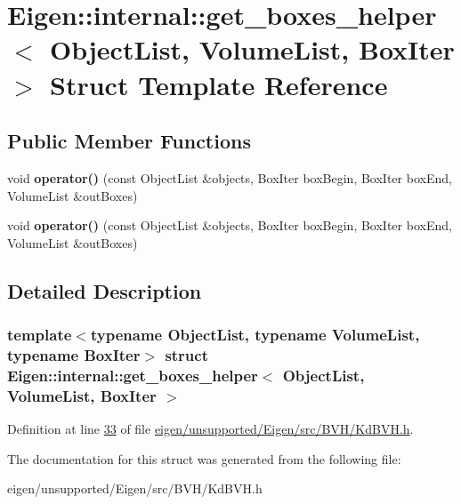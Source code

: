 \hypertarget{struct_eigen_1_1internal_1_1get__boxes__helper}{}\section{Eigen\+:\+:internal\+:\+:get\+\_\+boxes\+\_\+helper$<$ Object\+List, Volume\+List, Box\+Iter $>$ Struct Template Reference}
\label{struct_eigen_1_1internal_1_1get__boxes__helper}
\subsection*{Public Member Functions}
\begin{DoxyCompactItemize}
\item 
\mbox{\label{struct_eigen_1_1internal_1_1get__boxes__helper_ad3fcf7c11c88383d84b5db126bd310e4}} 
void {\bfseries operator()} (const Object\+List \&objects, Box\+Iter box\+Begin, Box\+Iter box\+End, Volume\+List \&out\+Boxes)
\item 
\mbox{\label{struct_eigen_1_1internal_1_1get__boxes__helper_ad3fcf7c11c88383d84b5db126bd310e4}} 
void {\bfseries operator()} (const Object\+List \&objects, Box\+Iter box\+Begin, Box\+Iter box\+End, Volume\+List \&out\+Boxes)
\end{DoxyCompactItemize}


\subsection{Detailed Description}
\subsubsection*{template$<$typename Object\+List, typename Volume\+List, typename Box\+Iter$>$\newline
struct Eigen\+::internal\+::get\+\_\+boxes\+\_\+helper$<$ Object\+List, Volume\+List, Box\+Iter $>$}



Definition at line \hyperlink{eigen_2unsupported_2_eigen_2src_2_b_v_h_2_kd_b_v_h_8h_source_l00033}{33} of file \hyperlink{eigen_2unsupported_2_eigen_2src_2_b_v_h_2_kd_b_v_h_8h_source}{eigen/unsupported/\+Eigen/src/\+B\+V\+H/\+Kd\+B\+V\+H.\+h}.



The documentation for this struct was generated from the following file\+:\begin{DoxyCompactItemize}
\item 
eigen/unsupported/\+Eigen/src/\+B\+V\+H/\+Kd\+B\+V\+H.\+h\end{DoxyCompactItemize}

